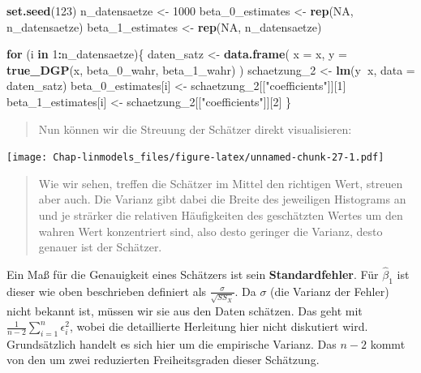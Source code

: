\documentclass[]{book}
\newenvironment{Shaded}{\begin{snugshade}}{\end{snugshade}}
\newcommand{\KeywordTok}[1]{\textcolor[rgb]{0.13,0.29,0.53}{\textbf{#1}}}
\newcommand{\DataTypeTok}[1]{\textcolor[rgb]{0.13,0.29,0.53}{#1}}
\newcommand{\DecValTok}[1]{\textcolor[rgb]{0.00,0.00,0.81}{#1}}
\newcommand{\StringTok}[1]{\textcolor[rgb]{0.31,0.60,0.02}{#1}}
\newcommand{\OtherTok}[1]{\textcolor[rgb]{0.56,0.35,0.01}{#1}}
\newcommand{\ControlFlowTok}[1]{\textcolor[rgb]{0.13,0.29,0.53}{\textbf{#1}}}
\newcommand{\OperatorTok}[1]{\textcolor[rgb]{0.81,0.36,0.00}{\textbf{#1}}}
\newcommand{\NormalTok}[1]{#1}
\begin{document}
\begin{Shaded}
\begin{Highlighting}[]
\KeywordTok{set.seed}\NormalTok{(}\DecValTok{123}\NormalTok{)}
\NormalTok{n_datensaetze <-}\StringTok{ }\DecValTok{1000}
\NormalTok{beta_0_estimates <-}\StringTok{ }\KeywordTok{rep}\NormalTok{(}\OtherTok{NA}\NormalTok{, n_datensaetze)}
\NormalTok{beta_1_estimates <-}\StringTok{ }\KeywordTok{rep}\NormalTok{(}\OtherTok{NA}\NormalTok{, n_datensaetze)}

\ControlFlowTok{for}\NormalTok{ (i }\ControlFlowTok{in} \DecValTok{1}\OperatorTok{:}\NormalTok{n_datensaetze)\{}
\NormalTok{  daten_satz <-}\StringTok{ }\KeywordTok{data.frame}\NormalTok{(}
    \DataTypeTok{x =}\NormalTok{ x,}
    \DataTypeTok{y =} \KeywordTok{true_DGP}\NormalTok{(x, beta_0_wahr, beta_1_wahr)}
\NormalTok{  )}
\NormalTok{  schaetzung_}\DecValTok{2}\NormalTok{ <-}\StringTok{ }\KeywordTok{lm}\NormalTok{(y}\OperatorTok{~}\NormalTok{x, }\DataTypeTok{data =}\NormalTok{ daten_satz)}
\NormalTok{  beta_0_estimates[i] <-}\StringTok{ }\NormalTok{schaetzung_}\DecValTok{2}\NormalTok{[[}\StringTok{"coefficients"}\NormalTok{]][}\DecValTok{1}\NormalTok{]}
\NormalTok{  beta_1_estimates[i] <-}\StringTok{ }\NormalTok{schaetzung_}\DecValTok{2}\NormalTok{[[}\StringTok{"coefficients"}\NormalTok{]][}\DecValTok{2}\NormalTok{]}
\NormalTok{\}}
\end{Highlighting}
\end{Shaded}

\begin{quote}
Nun können wir die Streuung der Schätzer direkt visualisieren:
\end{quote}

\texttt{[image: Chap-linmodels\_files/figure-latex/unnamed-chunk-27-1.pdf]}

\begin{quote}
Wie wir sehen, treffen die Schätzer im Mittel den richtigen Wert,
streuen aber auch. Die Varianz gibt dabei die Breite des jeweiligen
Histograms an und je strärker die relativen Häufigkeiten des geschätzten
Wertes um den wahren Wert konzentriert sind, also desto geringer die
Varianz, desto genauer ist der Schätzer.
\end{quote}

Ein Maß für die Genauigkeit eines Schätzers ist sein
\textbf{Standardfehler}. Für \(\hat{\beta}_1\) ist dieser wie oben
beschrieben definiert als \(\frac{\sigma}{\sqrt{SS_X}}\). Da \(\sigma\)
(die Varianz der Fehler) nicht bekannt ist, müssen wir sie aus den Daten
schätzen. Das geht mit \(\frac{1}{n-2}\sum_{i=1}^n\epsilon_i^2\), wobei
die detaillierte Herleitung hier nicht diskutiert wird. Grundsätzlich
handelt es sich hier um die empirische Varianz. Das \(n-2\) kommt von
den um zwei reduzierten Freiheitsgraden dieser Schätzung.
\end{document}
